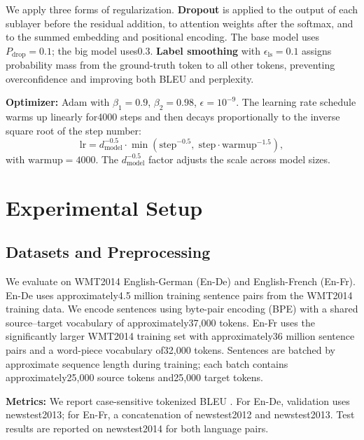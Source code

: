﻿\documentclass{article}
\begin{document}
We apply three forms of regularization. \textbf{Dropout} \citep{srivastava2014dropout} is applied to the output of each sublayer before the residual addition, to attention weights after the softmax, and to the summed embedding and positional encoding. The base model uses $P_{\text{drop}} =0.1$; the big model uses0.3. \textbf{Label smoothing} \citep{szegedy2016rethinking} with $\epsilon_{\text{ls}} =0.1$ assigns probability mass from the ground-truth token to all other tokens, preventing overconfidence and improving both BLEU and perplexity.

\textbf{Optimizer:} Adam \citep{kingma2015adam} with $\beta_1 =0.9$, $\beta_2 =0.98$, $\epsilon =10^{-9}$. The learning rate schedule warms up linearly for4000 steps and then decays proportionally to the inverse square root of the step number:
\begin{equation}
\text{lr} = d_{\text{model}}^{-0.5} \cdot \min(\text{step}^{-0.5},\; \text{step} \cdot \text{warmup}^{-1.5}),
\label{eq:lr}
\end{equation}
with $\text{warmup}=4000$. The $d_{\text{model}}^{-0.5}$ factor adjusts the scale across model sizes.


\section{Experimental Setup}

\subsection{Datasets and Preprocessing}

We evaluate on WMT2014 English-German (En-De) and English-French (En-Fr). En-De uses approximately4.5 million training sentence pairs from the WMT2014 training data. We encode sentences using byte-pair encoding (BPE) \citep{sennrich2016rare} with a shared source--target vocabulary of approximately37,000 tokens. En-Fr uses the significantly larger WMT2014 training set with approximately36 million sentence pairs and a word-piece vocabulary of32,000 tokens. Sentences are batched by approximate sequence length during training; each batch contains approximately25,000 source tokens and25,000 target tokens.

\textbf{Metrics:} We report case-sensitive tokenized BLEU \citep{papineni2002bleu}. For En-De, validation uses newstest2013; for En-Fr, a concatenation of newstest2012 and newstest2013. Test results are reported on newstest2014 for both language pairs.
\end{document}
